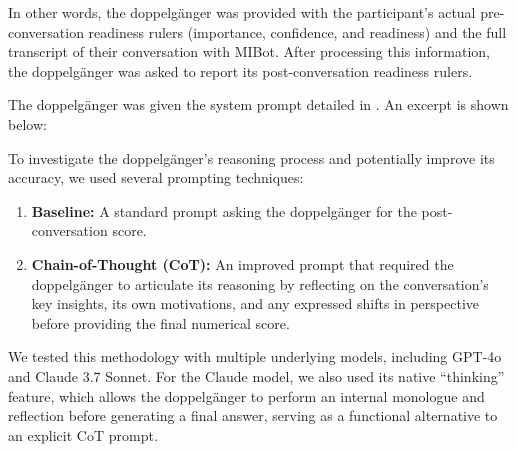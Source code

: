 In other words, the doppelgänger was provided with the participant's actual pre-conversation readiness rulers (importance, confidence, and readiness) and the full transcript of their conversation with MIBot. After processing this information, the doppelgänger was asked to report its post-conversation readiness rulers.

The doppelgänger was given the system prompt detailed in . An excerpt is shown below:


To investigate the doppelgänger's reasoning process and potentially improve its accuracy, we used several prompting techniques:

\begin{enumerate}
	\item \textbf{Baseline:} A standard prompt asking the doppelgänger for the post-conversation score.
	\item \textbf{Chain-of-Thought (CoT):} An improved prompt that required the doppelgänger to articulate its reasoning by reflecting on the conversation's key insights, its own motivations, and any expressed shifts in perspective before providing the final numerical score.
\end{enumerate}

We tested this methodology with multiple underlying models, including GPT-4o and Claude 3.7 Sonnet. For the Claude model, we also used its native ``thinking'' feature, which allows the doppelgänger to perform an internal monologue and reflection before generating a final answer, serving as a functional alternative to an explicit CoT prompt.

